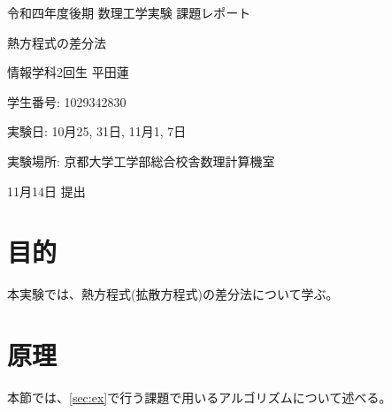 \documentclass[a4j, titlepage]{jsarticle}
\numberwithin{equation}{section}
\begin{document}
\begin{titlepage}
    \begin{center}
        {\Large 令和四年度後期 数理工学実験 課題レポート}

        \vspace*{180truept}

        {\Huge 熱方程式の差分法}

        \vspace{160truept}

        {\Large 情報学科2回生 平田蓮}

        \vspace{10truept}

        {\large 学生番号: 1029342830}

        \vspace{60truept}

        {\large 実験日: 10月25, 31日, 11月1, 7日}

        \vspace{10truept}

        {\large 実験場所: 京都大学工学部総合校舎数理計算機室}

        \vspace{60truept}

        {\large 11月14日 提出}
    \end{center}
\end{titlepage}

\tableofcontents
\clearpage

\section{目的}
    本実験では、熱方程式(拡散方程式)の差分法について学ぶ。

\section{原理}
    本節では、\ref{sec:ex}で行う課題で用いるアルゴリズムについて述べる。
\end{document}

